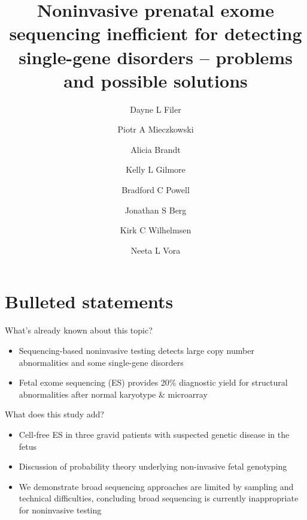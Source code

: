 \documentclass{article}\usepackage[]{graphicx}\usepackage[]{color}
\begin{document}
\title{Noninvasive prenatal exome sequencing inefficient for detecting single-gene disorders -- problems and possible solutions}

\author[1,2,*]{Dayne L Filer}
\author[1]{Piotr A Mieczkowski}
\author[1]{Alicia Brandt}
\author[3]{Kelly L Gilmore}
\author[1,2]{Bradford C Powell}
\author[1]{Jonathan S Berg}
\author[1,2,4]{Kirk C Wilhelmsen}
\author[1,3]{Neeta L Vora}
\date{}

\maketitle

\linenumbers

\section{Bulleted statements}

What's already known about this topic?
\begin{itemize}
    \item Sequencing-based noninvasive testing detects large copy number abnormalities and some single-gene disorders
    \item Fetal exome sequencing (ES) provides 20\% diagnostic yield for structural abnormalities after normal karyotype \& microarray
\end{itemize}

What does this study add?
\begin{itemize}
    \item Cell-free ES in three gravid patients with suspected genetic disease in the fetus
    \item Discussion of probability theory underlying non-invasive fetal genotyping
    \item We demonstrate broad sequencing approaches are limited by sampling and technical difficulties, concluding broad sequencing is currently inappropriate for noninvasive testing
\end{itemize}
\end{document}
